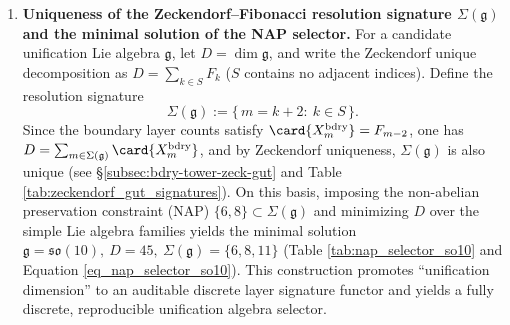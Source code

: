 \begin{enumerate}
\begin{itemize}
    \item \textbf{Unique scale of the discrete--continuous spectral isomorphism: ND determinant limit \texorpdfstring{\(\cosh(\sqrt{s})\)}{cosh(sqrt(s))}.}
    The continuous ND operator \(\mathcal L=-\dd^2/\dd x^2\) (\(u'(0)=0,u(1)=0\)) satisfies \(\det(\mathcal L+s)=\cosh(\sqrt{s})\).
    The discrete operator under the scaling
    \(
    \widetilde L_k=\frac{(2k+1)^2}{4}L_k
    \)
    achieves strict spectral matching, with the determinant limit
    \[
    \det\!\Bigl(L_k+\frac{4s}{(2k+1)^2}I\Bigr)\ \longrightarrow\ \cosh(\sqrt{s})\qquad(s\ge 0),
    \]
    so the scale factor \(t/4\) is structurally forced by the half-odd-integer mode matching of the continuous ND spectrum (Corollary \ref{cor:pom-Lk-continuum-ND-det-cosh}).

    

    
  \end{itemize}

  \item \textbf{Uniqueness of the Zeckendorf--Fibonacci resolution signature \texorpdfstring{$\Sigma(\mathfrak g)$}{Sigma(g)} and the minimal solution of the NAP selector.}
  For a candidate unification Lie algebra \(\mathfrak g\), let \(D=\dim\mathfrak g\), and write the Zeckendorf unique decomposition as
  \(D=\sum_{k\in S}F_k\) (\(S\) contains no adjacent indices).
  Define the resolution signature
  \[
  \Sigma(\mathfrak g):=\{\,m=k+2:\ k\in S\,\}.
  \]
  Since the boundary layer counts satisfy \(\card{X_m^{\mathrm{bdry}}}=F_{m-2}\), one has
  \(D=\sum_{m\in\Sigma(\mathfrak g)}\card{X_m^{\mathrm{bdry}}}\), and by Zeckendorf uniqueness, \(\Sigma(\mathfrak g)\) is also unique (see \S\ref{subsec:bdry-tower-zeck-gut} and Table \ref{tab:zeckendorf_gut_signatures}).
  On this basis, imposing the non-abelian preservation constraint (NAP) \(\{6,8\}\subset \Sigma(\mathfrak g)\) and minimizing \(D\) over the simple Lie algebra families yields the minimal solution
  \(
  \mathfrak g=\mathfrak{so}(10),\ D=45,\ \Sigma(\mathfrak g)=\{6,8,11\}
  \)
  (Table \ref{tab:nap_selector_so10} and Equation \ref{eq_nap_selector_so10}).
  This construction promotes ``unification dimension'' to an auditable discrete layer signature functor and yields a fully discrete, reproducible unification algebra selector.


\end{enumerate}
